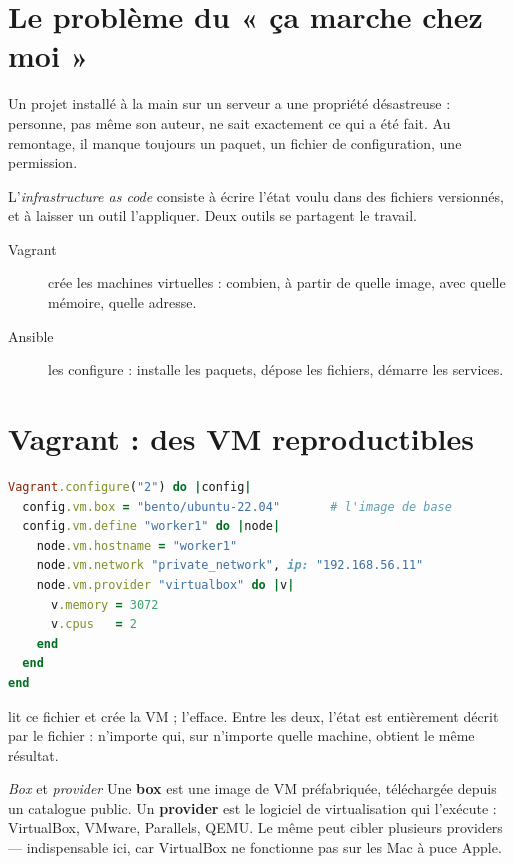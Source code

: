 \section{Le problème du « ça marche chez moi »}

Un projet installé à la main sur un serveur a une propriété désastreuse :
personne, pas même son auteur, ne sait exactement ce qui a été fait. Au
remontage, il manque toujours un paquet, un fichier de configuration, une
permission.

L'\emph{infrastructure as code} consiste à écrire l'état voulu dans des
fichiers versionnés, et à laisser un outil l'appliquer. Deux outils se
partagent le travail.

\begin{description}
\item[Vagrant] crée les machines virtuelles : combien, à partir de quelle
  image, avec quelle mémoire, quelle adresse.
\item[Ansible] les configure : installe les paquets, dépose les fichiers,
  démarre les services.
\end{description}

\section{Vagrant : des VM reproductibles}

\begin{lstlisting}[language=Ruby,caption={Le principe, en quelques lignes}]
Vagrant.configure("2") do |config|
  config.vm.box = "bento/ubuntu-22.04"       # l'image de base
  config.vm.define "worker1" do |node|
    node.vm.hostname = "worker1"
    node.vm.network "private_network", ip: "192.168.56.11"
    node.vm.provider "virtualbox" do |v|
      v.memory = 3072
      v.cpus   = 2
    end
  end
end
\end{lstlisting}

 lit ce fichier et crée la VM ;  l'efface.
Entre les deux, l'état est entièrement décrit par le fichier : n'importe qui,
sur n'importe quelle machine, obtient le même résultat.

\begin{notion}{\emph{Box} et \emph{provider}}
Une \textbf{box} est une image de VM préfabriquée, téléchargée depuis un
catalogue public. Un \textbf{provider} est le logiciel de virtualisation qui
l'exécute : VirtualBox, VMware, Parallels, QEMU. Le même  peut
cibler plusieurs providers --- indispensable ici, car VirtualBox ne fonctionne
pas sur les Mac à puce Apple.
\end{notion}

